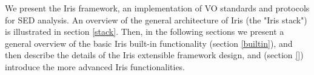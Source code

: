 We present the Iris framework, an implementation of VO standards and protocols for SED analysis. An overview of the general architecture of Iris (the "Iris stack") is illustrated in section \ref{stack}. Then, in the following sections we present a general overview of the basic Iris built-in functionality (section \ref{builtin}), and then describe the details of the Iris extensible framework design, and (section \ref{}) introduce the more advanced Iris functionalities.